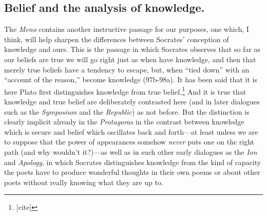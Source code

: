 \documentclass[11pt]{amsart}
\begin{document}
\subsection{Belief and the analysis of knowledge.} The \emph{Meno}
contains another instructive passage for our purposes, one which, I
think, will help sharpen the differences between Socrates' conception
of knowledge and ours. This is the passage in which Socrates observes
that so far as our beliefs are true we will go right just as when have
knowledge, and then that merely true beliefs have a tendency to
escape, but, when ``tied down'' with an ``account of the reason,''
become knowledge (97b-98a). It has been said that it is here Plato
first distinguishes knowledge from true belief.\footnote{[cite]} And
it is true that knowledge and true belief are deliberately contrasted
here (and in later dialogues such as the \emph{Symposium} and the
\emph{Republic}) as not before. But the distinction is clearly
implicit already in the \emph{Protagoras} in the contrast between
knowledge which is secure and belief which oscillates back and
forth---at least unless we are to suppose that the power of
appearances somehow \emph{never} puts one on the right path (and why
wouldn't it?)---as well as in such other early dialogues as the
\emph{Ion} and \emph{Apology}, in which Socrates distinguishes
knowledge from the kind of capacity the poets have to produce
wonderful thoughts in their own poems or about other poets without
really knowing what they are up to.
\end{document}
